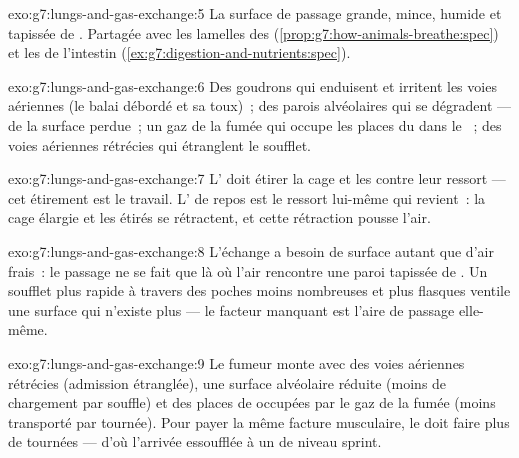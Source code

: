 \begin{solution}{exo:g7:lungs-and-gas-exchange:5}
La surface de passage grande, mince, humide et tapissée de .
Partagée avec les lamelles des 
(\cref{prop:g7:how-animals-breathe:spec}) et les  de
l'intestin
(\cref{ex:g7:digestion-and-nutrients:spec}).
\end{solution}

\begin{solution}{exo:g7:lungs-and-gas-exchange:6}
Des goudrons qui enduisent et irritent les voies aériennes (le balai
débordé et sa toux)~; des parois alvéolaires qui se dégradent --- de
la surface perdue~; un gaz de la fumée qui occupe les places du
 dans le ~; des voies aériennes rétrécies qui étranglent
le soufflet.
\end{solution}

\begin{solution}{exo:g7:lungs-and-gas-exchange:7}
L' doit étirer la cage et les  contre leur ressort
--- cet étirement est le travail. L' de repos est le
ressort lui-même qui revient~: la cage élargie et les  étirés
se rétractent, et cette rétraction pousse l'air.
\end{solution}

\begin{solution}{exo:g7:lungs-and-gas-exchange:8}
L'échange a besoin de surface autant que d'air frais~: le passage ne
se fait que là où l'air rencontre une paroi tapissée de . Un
soufflet plus rapide à travers des poches moins nombreuses et plus
flasques ventile une surface qui n'existe plus --- le facteur
manquant est l'aire de passage elle-même.
\end{solution}

\begin{solution}{exo:g7:lungs-and-gas-exchange:9}
Le fumeur monte avec des voies aériennes rétrécies (admission
étranglée), une surface alvéolaire réduite (moins de chargement par
souffle) et des places de  occupées par le gaz de la fumée
(moins transporté par tournée). Pour payer la même facture
musculaire, le  doit faire plus de tournées --- d'où l'arrivée
essoufflée à un  de niveau sprint.
\end{solution}

